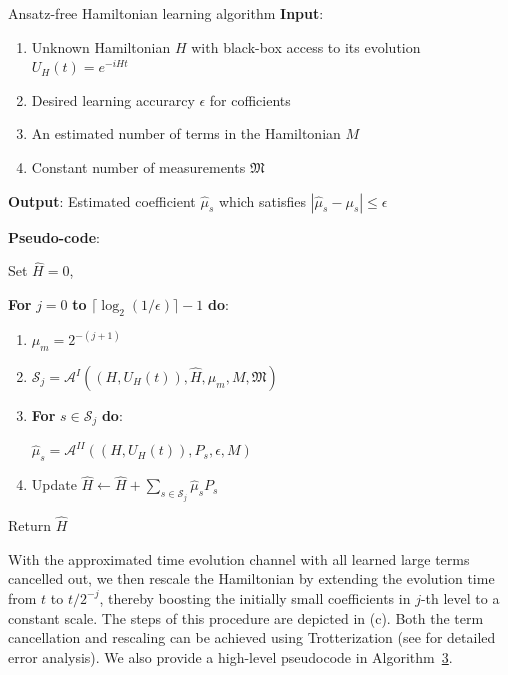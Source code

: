 \documentclass[twocolumn,superscriptaddress,aps,showpacs,amsmath,amstex,amssymb,citeautoscript,floatfix,pra,preprintnumbers]{revtex4-2}
\newcounter{alg}
\theoremstyle{plain}
\theoremstyle{plain}
\theoremstyle{plain}
\theoremstyle{plain}
\theoremstyle{plain}
\theoremstyle{plain}
\begin{document}
\begin{alg}[htbp]{Ansatz-free Hamiltonian learning algorithm}
\label{alg:algorithm_all}
    \textbf{Input}: \vspace{-2mm}
\begin{enumerate}
    \item Unknown Hamiltonian $H$ with black-box access to its evolution $U_{H}(t)=e^{-iHt}$\vspace{-2mm}
    \item Desired learning accurarcy $\epsilon$ for cofficients\vspace{-2mm}
    \item An estimated number of terms in the Hamiltonian $M$\vspace{-2mm}
    \item Constant number of measurements $\mathfrak{M}$
\end{enumerate}\vspace{-2mm}

\textbf{Output}: Estimated coefficient $\hat{\mu}_s$ which satisfies $|\hat{\mu}_s-\mu_s|\leq \epsilon$\vspace{2mm}

\textbf{Pseudo-code}:\vspace{0mm}

Set $\hat{H}=0$,

\textbf{For} $j = 0$ \textbf{to} $\lceil\log_{2}(1/\epsilon)\rceil-1$ \textbf{do}:\vspace{-2mm}
\begin{enumerate}
    \item $\mu_m = 2^{-(j+1)}$ \vspace{-2mm}
    \item $\mathcal{S}_j=\mathcal{A}^{I}((H,U_H(t)),\hat{H},\mu_m,M,\mathfrak{M})$ \vspace{-2mm}
    \item \textbf{For} $s\in \mathcal{S}_j$ \textbf{do}:
    
        $\hat{\mu}_s=\mathcal{A}^{II}((H,U_H(t)),P_s,\epsilon,M)$
    \vspace{-2mm}
    \item Update $\hat{H}\gets \hat{H}+\sum_{s\in \mathcal{S}_j}\hat{\mu}_sP_s$
\end{enumerate}\vspace{-2mm}
Return $\hat{H}$
\end{alg}


With the approximated time evolution channel with all learned large terms cancelled out, we then rescale the Hamiltonian by extending the evolution time from $t$ to $t/2^{-j}$, thereby boosting the initially small coefficients in $j$-th level to a constant scale. The steps of this procedure are depicted in  (c). Both the term cancellation and rescaling can be achieved using Trotterization (see  for detailed error analysis). We also provide a high-level pseudocode in Algorithm~\hyperref[alg:algorithm_all]{3}.
\end{document}
